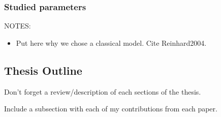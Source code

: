 \subsubsection{Studied parameters}
NOTES:
\begin{itemize}
\item Put here why we chose a classical model. Cite
Reinhard2004\cite{Reinhard2004}.
\end{itemize}






\subsection{Thesis Outline}
Don't forget a review/description of each sections of the thesis.

Include a subsection with each of my contributions from each paper.

